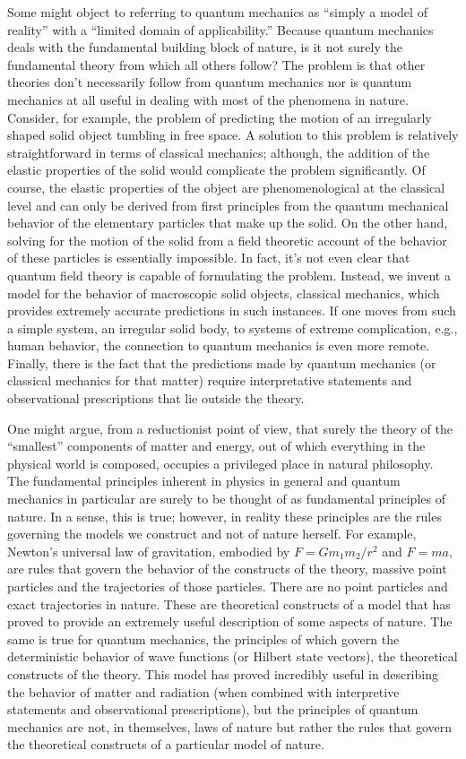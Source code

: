 \documentclass [12pt]{revtex4}
\begin{document}
Some might object to referring to quantum mechanics as ``simply a model of reality'' with a ``limited domain of applicability.''  Because quantum mechanics deals with the fundamental building block of nature, is it not surely the fundamental theory from which all others follow?  The problem is that other theories don't necessarily follow from quantum mechanics nor is quantum mechanics at all useful in dealing with most of the phenomena in nature.  Consider, for example, the problem of predicting the motion of an irregularly shaped solid object tumbling in free space.  A solution to this problem is relatively straightforward in terms of classical mechanics; although, the addition of the elastic properties of the solid would complicate the problem significantly.  Of course, the elastic properties of the object are phenomenological at the classical level and can only be derived from first principles from the quantum mechanical behavior of the elementary particles that make up the solid.  On the other hand, solving for the motion of the solid from a field theoretic account of the behavior of these particles is essentially impossible.  In fact, it’s not even clear that quantum field theory is capable of formulating the problem. Instead, we invent a model for the behavior of macroscopic solid objects, classical mechanics, which provides extremely accurate predictions in such instances.  If one moves from such a simple system, an irregular solid body, to systems of extreme complication, e.g., human behavior, the connection to quantum mechanics is even more remote.  Finally, there is the fact that the predictions made by quantum mechanics (or classical mechanics for that matter) require interpretative statements and observational prescriptions that lie outside the theory.

One might argue, from a reductionist point of view, that surely the theory of the ``smallest'' components of matter and energy, out of which everything in the physical world is composed, occupies a privileged place in natural philosophy.  The fundamental principles inherent in physics in general and quantum mechanics in particular are surely to be thought of as fundamental principles of nature.  In a sense, this is true; however, in reality these principles are the rules governing the models we construct and not of nature herself.  For example, Newton’s universal law of gravitation, embodied by $F = Gm_1m_2/r^2$ and $F = ma$, are rules that govern the behavior of the constructs of the theory, massive point particles and the trajectories of those particles.  There are no point particles and exact trajectories in nature.  These are theoretical constructs of a model that has proved to provide an extremely useful description of some aspects of nature.  The same is true for quantum mechanics, the principles of which govern the deterministic behavior of wave functions (or Hilbert state vectors), the theoretical constructs of the theory.  This model has proved incredibly useful in describing the behavior of matter and radiation (when combined with interpretive statements and observational prescriptions), but the principles of quantum mechanics are not, in themselves, laws of nature but rather the rules that govern the theoretical constructs of a particular model of nature.
\end{document}
